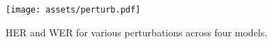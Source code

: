 \begin{figure}[!hbt]
    \centering
    \texttt{[image: assets/perturb.pdf]}
    \caption{HER and WER for various perturbations across four models.}
    \label{fig:perturb}
\end{figure}